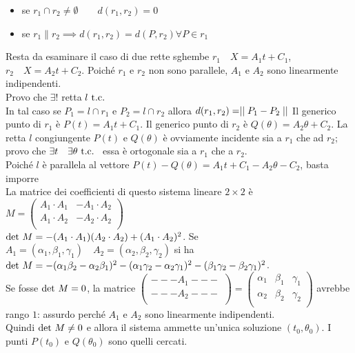 \documentclass[a4paper,NoNotes,GeneralMath]{stdmdoc}
\begin{document}
		\begin{itemize}
			\item se $r_1\cap r_2 \neq \emptyset \qquad d(r_1,r_2) = 0$
			\item se $r_1 \parallel r_2 \implies d(r_1, r_2) = d(P, r_2) \forall P\in r_1$
		\end{itemize}
		Resta da esaminare il caso di due rette sghembe $r_1 \quad X = A_1t+C_1$, $r_2 \quad X = A_2t+C_2$. Poiché $r_1$ e $r_2$ non sono parallele, $A_1$ e $A_2$ sono linearmente indipendenti. \\
		Provo che $\exists !$ retta $l \mbox{ t.c. }$  \\
		In tal caso se $P_1 = l \cap r_1$ e $P_2 = l\cap r_2$ allora $d(r_1, r_2) = \mid\mid P_1-P_2 \mid\mid$
		\Dimostrazione Il generico punto di $r_1$ è $P(t) = A_1t + C_1$. Il generico punto di $r_2$ è $Q(\theta) = A_2\theta + C_2$. La retta $l$ congiungente $P(t)$ e $Q(\theta)$ è ovviamente incidente sia a $r_1$ che ad $r_2$; provo che $\exists t \quad \exists \theta \mbox{ t.c. }$ essa è ortogonale sia a $r_1$ che a $r_2$. \\
		Poiché $l$ è parallela al vettore $P(t)-Q(\theta) = A_1t + C_1 - A_2\theta - C_2$, basta imporre  \\
		La matrice dei coefficienti di questo sistema lineare $2\times 2$ è $M = \left( \begin{array}{cc} A_1\cdot A_1 & - A_1\cdot A_2 \\ A_1\cdot A_2 & -A_2\cdot A_2 \\ \end{array} \right) $ \\
		$\mbox{det } M = -(A_1\cdot A_1)(A_2\cdot A_2) + (A_1\cdot A_2)^2$. Se $A_1 = (\alpha_1, \beta_1, \gamma_1) \quad A_2 = (\alpha_2, \beta_2, \gamma_2)$ si ha $\mbox{det } M = -(\alpha_1\beta_2 - \alpha_2\beta_1)^2 - (\alpha_1\gamma_2 - \alpha_2\gamma_1)^2 - (\beta_1\gamma_2 - \beta_2\gamma_1)^2$. \\
		Se fosse $\mbox{det } M = 0$, la matrice $\left( \begin{array}{c} --- A_1 --- \\ --- A_2 --- \\ \end{array} \right) = \left( \begin{array}{ccc} \alpha_1 & \beta_1 & \gamma_1 \\ \alpha_2 & \beta_2 & \gamma_2 \\ \end{array} \right)$ avrebbe rango $1$: assurdo perché $A_1$ e $A_2$ sono linearmente indipendenti. \\
		Quindi $\mbox{det } M \neq 0$ e allora il sistema ammette un'unica soluzione $(t_0, \theta_0)$. I punti $P(t_0)$ e $Q(\theta_0)$ sono quelli cercati.
\end{document}
